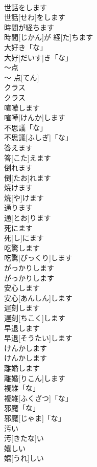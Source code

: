 \documentclass[8pt]{extreport}
\begin{document}
\begin{CJK}{UTF8}{min}
\\	世話をします	
\\	世話[せわ]をします	
\\	時間が経ちます	
\\	時間[じかん]が 経[た]ちます	
\\	大好き「な」	
\\	大好[だいす]き「な」	
\\	〜点	
\\	〜 点[てん]	
\\	クラス	
\\	クラス	
\\	喧嘩します	
\\	喧嘩[けんか]します	
\\	不思議「な」	
\\	不思議[ふしぎ]「な」	
\\	答えます	
\\	答[こた]えます	
\\	倒れます	
\\	倒[たお]れます	
\\	焼けます	
\\	焼[や]けます	
\\	通ります	
\\	通[とお]ります	
\\	死にます	
\\	死[し]にます	
\\	吃驚します	
\\	吃驚[びっくり]します	
\\	がっかりします	
\\	がっかりします	
\\	安心します	
\\	安心[あんしん]します	
\\	遅刻します	
\\	遅刻[ちこく]します	
\\	早退します	
\\	早退[そうたい]します	
\\	けんかします	
\\	けんかします	
\\	離婚します	
\\	離婚[りこん]します	
\\	複雑「な」	
\\	複雑[ふくざつ]「な」	
\\	邪魔「な」	
\\	邪魔[じゃま]「な」	
\\	汚い	
\\	汚[きたな]い	
\\	嬉しい	
\\	嬉[うれ]しい	

\end{CJK}
\end{document}
